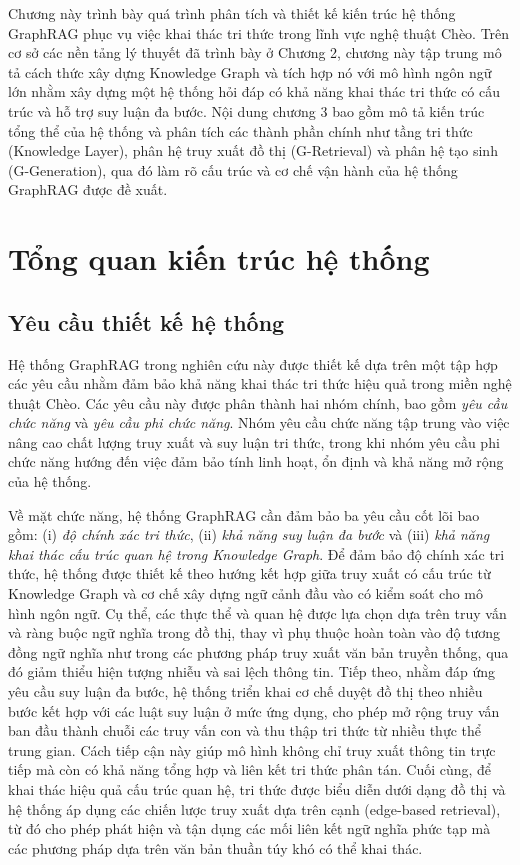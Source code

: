 Chương này trình bày quá trình phân tích và thiết kế kiến trúc hệ thống GraphRAG phục vụ việc khai thác tri thức trong lĩnh vực nghệ thuật Chèo. Trên cơ sở các nền tảng lý thuyết đã trình bày ở Chương 2, chương này tập trung mô tả cách thức xây dựng Knowledge Graph và tích hợp nó với mô hình ngôn ngữ lớn nhằm xây dựng một hệ thống hỏi đáp có khả năng khai thác tri thức có cấu trúc và hỗ trợ suy luận đa bước. Nội dung chương 3 bao gồm mô tả kiến trúc tổng thể của hệ thống và phân tích các thành phần chính như tầng tri thức (Knowledge Layer), phân hệ truy xuất đồ thị (G-Retrieval) và phân hệ tạo sinh (G-Generation), qua đó làm rõ cấu trúc và cơ chế vận hành của hệ thống GraphRAG được đề xuất.
\section{Tổng quan kiến trúc hệ thống}
\subsection{Yêu cầu thiết kế hệ thống}
Hệ thống GraphRAG trong nghiên cứu này được thiết kế dựa trên một tập hợp các yêu cầu nhằm đảm bảo khả năng khai thác tri thức hiệu quả trong miền nghệ thuật Chèo. Các yêu cầu này được phân thành hai nhóm chính, bao gồm \textit{yêu cầu chức năng} và \textit{yêu cầu phi chức năng}. Nhóm yêu cầu chức năng tập trung vào việc nâng cao chất lượng truy xuất và suy luận tri thức, trong khi nhóm yêu cầu phi chức năng hướng đến việc đảm bảo tính linh hoạt, ổn định và khả năng mở rộng của hệ thống.

Về mặt chức năng, hệ thống GraphRAG cần đảm bảo ba yêu cầu cốt lõi bao gồm: (i) \textit{độ chính xác tri thức}, (ii) \textit{khả năng suy luận đa bước} và (iii) \textit{khả năng khai thác cấu trúc quan hệ trong Knowledge Graph}. Để đảm bảo độ chính xác tri thức, hệ thống được thiết kế theo hướng kết hợp giữa truy xuất có cấu trúc từ Knowledge Graph và cơ chế xây dựng ngữ cảnh đầu vào có kiểm soát cho mô hình ngôn ngữ. Cụ thể, các thực thể và quan hệ được lựa chọn dựa trên truy vấn và ràng buộc ngữ nghĩa trong đồ thị, thay vì phụ thuộc hoàn toàn vào độ tương đồng ngữ nghĩa như trong các phương pháp truy xuất văn bản truyền thống, qua đó giảm thiểu hiện tượng nhiễu và sai lệch thông tin. Tiếp theo, nhằm đáp ứng yêu cầu suy luận đa bước, hệ thống triển khai cơ chế duyệt đồ thị theo nhiều bước kết hợp với các luật suy luận ở mức ứng dụng, cho phép mở rộng truy vấn ban đầu thành chuỗi các truy vấn con và thu thập tri thức từ nhiều thực thể trung gian. Cách tiếp cận này giúp mô hình không chỉ truy xuất thông tin trực tiếp mà còn có khả năng tổng hợp và liên kết tri thức phân tán. Cuối cùng, để khai thác hiệu quả cấu trúc quan hệ, tri thức được biểu diễn dưới dạng đồ thị và hệ thống áp dụng các chiến lược truy xuất dựa trên cạnh (edge-based retrieval), từ đó cho phép phát hiện và tận dụng các mối liên kết ngữ nghĩa phức tạp mà các phương pháp dựa trên văn bản thuần túy khó có thể khai thác.

